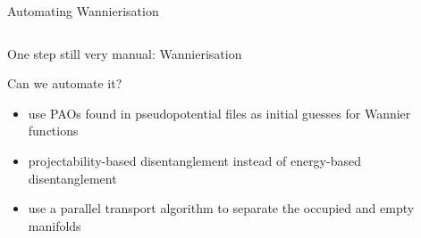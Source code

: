 \documentclass[xcolor=table,aspectratio=169]{beamer}
\numberwithin{equation}{section}
\begin{document}
\begin{frame}{Automating Wannierisation}

   \begin{columns}
      \begin{column}{0.5\textwidth}
         One step still very manual: Wannierisation

         Can we automate it?

         \begin{itemize}[<+(1)->]
            \item use PAOs found in pseudopotential files as initial guesses for Wannier functions
            \item projectability-based disentanglement instead of energy-based disentanglement
            \item use a parallel transport algorithm to separate the occupied and empty manifolds
         \end{itemize}
      \end{column}
      \begin{column}{0.5\textwidth}
         \begin{overlayarea}{\columnwidth}{0.6\paperheight}
            \begin{center}

\end{center}
\end{overlayarea}
\end{column}
\end{columns}
\end{frame}
\end{document}
